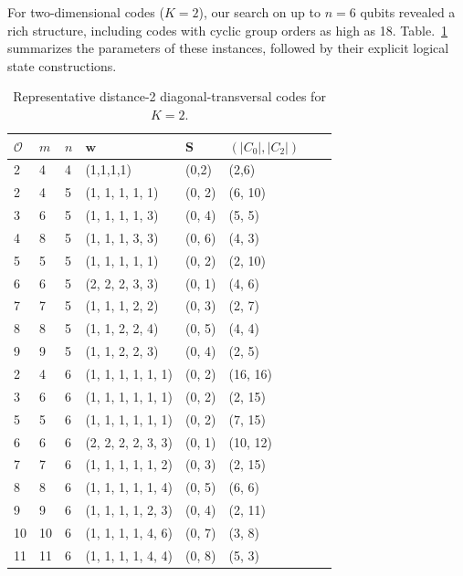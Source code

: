 \documentclass[pdflatex,sn-nature]{sn-jnl}%
\theoremstyle{thmstyleone}%
\theoremstyle{thmstyletwo}%
\theoremstyle{thmstylethree}%
\begin{document}
\begin{appendices}
For two-dimensional codes ($K=2$), our search on up to $n=6$ qubits revealed a rich structure, including codes with cyclic group orders as high as 18. Table.~\ref{tab:K=2} summarizes the parameters of these instances, followed by their explicit logical state constructions.

\begin{table}[t]
  \caption{Representative distance-2 diagonal-transversal codes for $K=2$.}
  \label{tab:K=2}
  \begin{tabular*}{\textwidth}{@{\extracolsep{\fill}}llllllll}
    \toprule
    $\mathcal{O}$ & $m$ & $n$ & $\mathbf w$
    & $\mathbf S$ & $(|C_0|,|C_2|)$ \\
    \midrule
    2 & 4 & 4 & (1,1,1,1) & (0,2) & (2,6) \\
    \midrule
    2   & 4   & 5 & (1, 1, 1, 1, 1)           & (0, 2) & (6, 10)  \\
    3   & 6   & 5 & (1, 1, 1, 1, 3)           & (0, 4) & (5, 5) \\
    4   & 8   & 5 & (1, 1, 1, 3, 3)           & (0, 6) & (4, 3) \\
    5   & 5   & 5 & (1, 1, 1, 1, 1)           & (0, 2) & (2, 10) \\
    6   & 6   & 5 & (2, 2, 2, 3, 3)           & (0, 1) & (4, 6) \\
    7   & 7   & 5 & (1, 1, 1, 2, 2)           & (0, 3) & (2, 7) \\
    8   & 8   & 5 & (1, 1, 2, 2, 4)           & (0, 5) & (4, 4) \\
    9   & 9   & 5 & (1, 1, 2, 2, 3)           & (0, 4) & (2, 5) \\
    \midrule
    2   & 4   & 6 & (1, 1, 1, 1, 1, 1)        & (0, 2) & (16, 16) \\
    3   & 6   & 6 & (1, 1, 1, 1, 1, 1)        & (0, 2) & (2, 15) \\
    5   & 5   & 6 & (1, 1, 1, 1, 1, 1)        & (0, 2) & (7, 15) \\
    6   & 6   & 6 & (2, 2, 2, 2, 3, 3)        & (0, 1) & (10, 12) \\
    7   & 7   & 6 & (1, 1, 1, 1, 1, 2)        & (0, 3) & (2, 15) \\
    8   & 8   & 6 & (1, 1, 1, 1, 1, 4)        & (0, 5) & (6, 6) \\
    9   & 9   & 6 & (1, 1, 1, 1, 2, 3)        & (0, 4) & (2, 11) \\
    10  & 10  & 6 & (1, 1, 1, 1, 4, 6)        & (0, 7) & (3, 8) \\
    11  & 11  & 6 & (1, 1, 1, 1, 4, 4)        & (0, 8) & (5, 3) \\

\end{tabular*}
\end{table}
\end{appendices}
\end{document}
